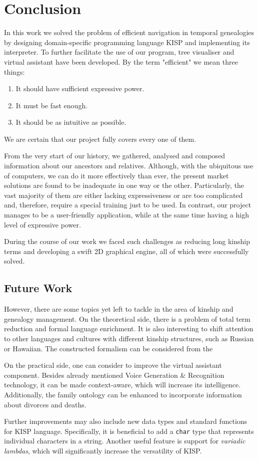 \chapter{Conclusion}
\label{chap:conclusion}
In this work we solved the problem of efficient navigation in temporal genealogies by designing domain-specific programming language
KISP and implementing its interpreter. To further facilitate the use of our program, tree visualiser and virtual assistant have
been developed. By the term "efficient" we mean three things:
\begin{enumerate}
    \item{It should have sufficient expressive power.}
    \item{It must be fast enough.}
    \item{It should be as intuitive as possible.}
\end{enumerate}
We are certain that our project fully covers every one of them.

From the very start of our history, we gathered, analysed and composed information about our ancestors and relatives.
Although, with the ubiquitous use of computers, we can do it more effectively than ever, the present market solutions are
found to be inadequate in one way or the other. Particularly, the vast majority of them are either lacking expressiveness or are
too complicated and, therefore, require a special training just to be used. In contrast, our project manages to be a user-friendly
application, while at the same time having a high level of expressive power.

During the course of our work we faced such challenges as reducing long kinship terms and developing a swift 2D graphical
engine, all of which were successfully solved.

\section{Future Work}
However, there are some topics yet left to tackle in the area of kinship and genealogy management. On the theoretical side, there
is a problem of total term reduction and formal language enrichment. It is also interesting to shift attention to other languages
and cultures with different kinship structures, such as Russian or Hawaiian. The constructed formalism can be considered from the

On the practical side, one can consider to improve the virtual assistant component. Besides already mentioned Voice Generation \&
Recognition technology, it can be made context-aware, which will increase its intelligence. Additionally, the family ontology can
be enhanced to incorporate information about divorces and deaths.

Further improvements may also include new data types and standard functions for KISP language. Specifically, it is beneficial to
add a \texttt{char} type that represents individual characters in a string. Another useful feature is support for \textit{variadic
lambdas}, which will significantly increase the versatility of KISP.
